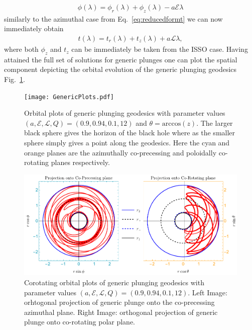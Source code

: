 \documentclass[12pt, amsmath]{revtex4-2}
\newcommand\lam{\lambda}
\newcommand\EN{\mathcal{E}}
\newcommand\ANG{\mathcal{L}}
\begin{document}
\begin{align}
    \phi(\lam) = \phi_r(\lam) + \phi_z(\lam) - a \EN \lam
\end{align}   
similarly to the azimuthal case from Eq.~\eqref{eq:reducedformt} we can now immediately obtain
\begin{align}
    t(\lam) = t_r(\lam) +   t_z(\lam) +a \ANG \lam,
\end{align}
where both $\phi_z$ and $t_z$ can be immediately be taken from the ISSO case. Having attained the full set of solutions for generic plunges one can plot the spatial component depicting the orbital evolution of the generic plunging geodesics Fig.~\ref{fig:genericplots}. 
\begin{figure}[tb!]
    \centering
    \texttt{[image: GenericPlots.pdf]}
         \caption{Orbital plots of generic plunging geodesics with parameter values $(a,\EN,\ANG,Q) = (0.9,0.94,0.1,12)$ and $\theta = \mathrm{arccos}(z)$. The larger black sphere gives the horizon of the black hole where as the smaller sphere simply gives a point along the geodesics. Here the cyan and orange planes are the azimuthally co-precessing and poloidally co-rotating planes respectively. }
    \label{fig:genericplots}
\end{figure}
\begin{figure}[tb!]
    \centering
    \includegraphics[width=150mm]{corotatingGenericPlots.pdf}
    \caption{Corotating orbital plots of generic plunging geodesics with parameter values $(a,\EN,\ANG,Q) = (0.9,0.94,0.1,12)$. Left Image: orhtogonal projection of generic plunge onto the co-precessing azimuthal plane. Right Image: orthogonal projection of generic plunge onto co-rotating polar plane.}
    \label{fig:coorotatinggeneric}
\end{figure}
\end{document}
